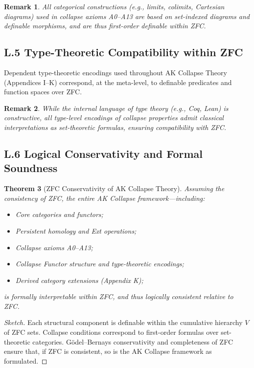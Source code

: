 \documentclass[11pt]{article}
\newtheorem{theorem}{Theorem}[section]
\newtheorem{remark}[theorem]{Remark}
\begin{document}
\begin{remark}
All categorical constructions (e.g., limits, colimits, Cartesian diagrams) used in collapse axioms A0–A13  
are based on set-indexed diagrams and definable morphisms, and are thus first-order definable within ZFC.
\end{remark}

\subsection*{L.5 Type-Theoretic Compatibility within ZFC}

Dependent type-theoretic encodings used throughout AK Collapse Theory (Appendices I–K) correspond, at the meta-level, to definable predicates and function spaces over ZFC.

\begin{remark}
While the internal language of type theory (e.g., Coq, Lean) is constructive, all type-level encodings of collapse properties admit classical interpretations as set-theoretic formulas, ensuring compatibility with ZFC.
\end{remark}

\subsection*{L.6 Logical Conservativity and Formal Soundness}

\begin{theorem}[ZFC Conservativity of AK Collapse Theory]
Assuming the consistency of ZFC, the entire AK Collapse framework—including:

\begin{itemize}
    \item Core categories and functors;
    \item Persistent homology and Ext operations;
    \item Collapse axioms A0–A13;
    \item Collapse Functor structure and type-theoretic encodings;
    \item Derived category extensions (Appendix K);
\end{itemize}

is formally interpretable within ZFC, and thus logically consistent relative to ZFC.
\end{theorem}

\begin{proof}[Sketch]
Each structural component is definable within the cumulative hierarchy \( V \) of ZFC sets.  
Collapse conditions correspond to first-order formulas over set-theoretic categories.  
Gödel–Bernays conservativity and completeness of ZFC ensure that, if ZFC is consistent, so is the AK Collapse framework as formulated.
\end{proof}
\end{document}
